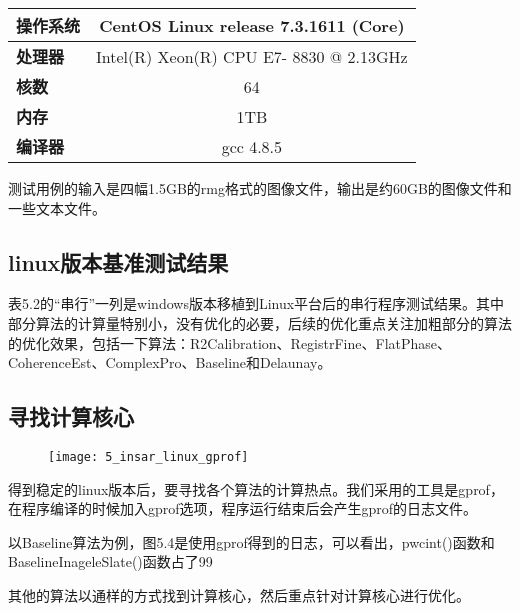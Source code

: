 \begin{table}[!htbp]
    \label{tab:5_insar_test_env}
    \centering
    \footnotesize
    \setlength{\tabcolsep}{4pt}
    \renewcommand{\arraystretch}{1.2} 
    \begin{tabular}{|>{\bfseries}l|c|}
        \hline
        操作系统 & CentOS Linux release 7.3.1611 (Core) \\ \hline
        处理器 & Intel(R) Xeon(R) CPU E7- 8830  @ 2.13GHz \\ \hline
        核数 & 64 \\ \hline
        内存 & 1TB \\ \hline
        编译器 & gcc 4.8.5 \\ \hline
    \end{tabular}
\end{table}

测试用例的输入是四幅1.5GB的rmg格式的图像文件，输出是约60GB的图像文件和一些文本文件。

\subsection{linux版本基准测试结果}

表5.2的“串行”一列是windows版本移植到Linux平台后的串行程序测试结果。其中部分算法的计算量特别小，没有优化的必要，后续的优化重点关注加粗部分的算法的优化效果，包括一下算法：R2Calibration、RegistrFine、FlatPhase、CoherenceEst、ComplexPro、Baseline和Delaunay。

\subsection{寻找计算核心}

\begin{figure}[!htbp]
    \centering
    \texttt{[image: 5\_insar\_linux\_gprof]}
    \label{fig:5_insar_linux_gprof}
\end{figure}

得到稳定的linux版本后，要寻找各个算法的计算热点。我们采用的工具是gprof，在程序编译的时候加入gprof选项，程序运行结束后会产生gprof的日志文件。

以Baseline算法为例，图5.4是使用gprof得到的日志，可以看出，pwcint()函数和BaselineInageleSlate()函数占了99%

其他的算法以通样的方式找到计算核心，然后重点针对计算核心进行优化。

